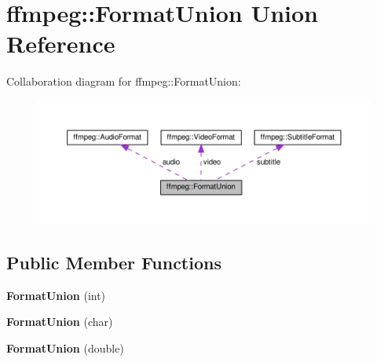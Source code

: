 \hypertarget{unionffmpeg_1_1FormatUnion}{}\section{ffmpeg\+:\+:Format\+Union Union Reference}
\label{unionffmpeg_1_1FormatUnion}


Collaboration diagram for ffmpeg\+:\+:Format\+Union\+:
\nopagebreak
\begin{figure}[H]
\begin{center}
\leavevmode
\includegraphics[width=350pt]{unionffmpeg_1_1FormatUnion__coll__graph}
\end{center}
\end{figure}
\subsection*{Public Member Functions}
\begin{DoxyCompactItemize}
\item 
\mbox{\label{unionffmpeg_1_1FormatUnion_aa6ca09fe912a192371f4a501aa3fdb6a}} 
{\bfseries Format\+Union} (int)
\item 
\mbox{\label{unionffmpeg_1_1FormatUnion_a16d6f17483c5cf4085633ba897293919}} 
{\bfseries Format\+Union} (char)
\item 
\mbox{\label{unionffmpeg_1_1FormatUnion_ae9879aa2a8d129048852fc5111aa9208}} 
{\bfseries Format\+Union} (double)
\end{DoxyCompactItemize}
